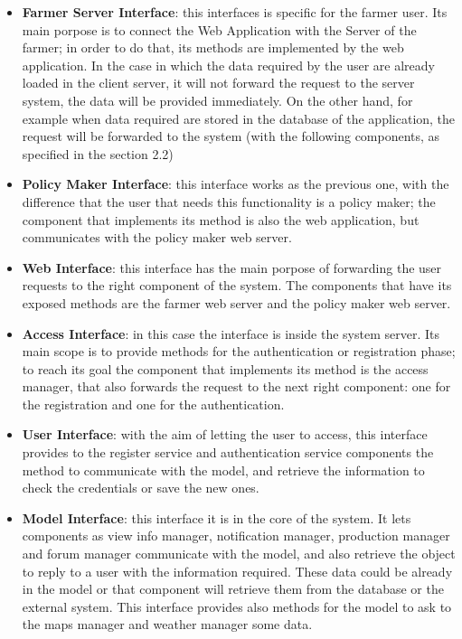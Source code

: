 \begin{itemize}
    \item \textbf{Farmer Server Interface}: this interfaces is specific for the farmer user. Its main porpose is to connect the Web Application with the Server of the farmer; in order to do that, its methods are implemented by the web application. In the case in which the data required by the user are already loaded in the client server, it will not forward the request to the server system, the data will be provided immediately. On the other hand, for example when data required are stored in the database of the application, the request will be forwarded to the system (with the following components, as specified in the section 2.2)
    \item \textbf{Policy Maker Interface}: this interface works as the previous one, with the difference that the user that needs this functionality is a policy maker; the component that implements its method is also the web application, but communicates with the policy maker web server.
    \item \textbf{Web Interface}: this interface has the main porpose of forwarding the user requests to the right component of the system. The components that have its exposed methods are the farmer web server and the policy maker web server.   
    \item \textbf{Access Interface}: in this case the interface is inside the system server. Its main scope is to provide methods for the authentication or registration phase; to reach its goal the component that implements its method is the access manager, that also forwards the request to the next right component: one for the registration and one for the authentication.
    \item \textbf{User Interface}: with the aim of letting the user to access, this interface provides to the register service and authentication service components the method to communicate with the model, and retrieve the information to check the credentials or save the new ones.
    \item \textbf{Model Interface}: this interface it is in the core of the system. It lets components as view info manager, notification manager, production manager and forum manager communicate with the model, and also retrieve the object to reply to a user with the information required. These data could be already in the model or that component will retrieve them from the database or the external system. This interface provides also methods for the model to ask to the maps manager and weather manager some data.  

\end{itemize}

